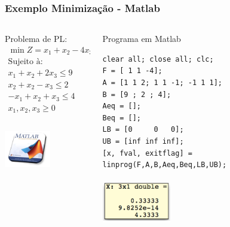 \begin{frame}[fragile]
	\frametitle{Exemplo Minimização - Matlab}
	\centering
	\begin{columns}
		\begin{column}{0.3\textwidth}
			\begin{block}{Problema de PL:}
				\begin{equation*}
					\begin{matrix}
						\scriptstyle \min Z = x_1 + x_2 - 4x_3 \\
						\scriptstyle \text{Sujeito à:} \\
						\scriptstyle x_1 + x_2 + 2x_3 \le 9 \\
						\scriptstyle x_2 + x_2 - x_3 \le 2 \\
						\scriptstyle -x_1 + x_2 + x_3 \le 4 \\
						\scriptstyle x_1, x_2, x_3 \ge 0 \\
					\end{matrix}
				\end{equation*}
			\end{block}
			\includegraphics[width=2cm,height=2cm]{solver_matlab.png}			
		\end{column}
		\begin{column}{0.7\textwidth}
			\begin{exampleblock}{Programa em Matlab}
				\begin{lstlisting}[basicstyle=\tiny]  
clear all; close all; clc;
F = [ 1 1 -4];
A = [1 1 2; 1 1 -1; -1 1 1];
B = [9 ; 2 ; 4];
Aeq = [];
Beq = [];
LB = [0     0   0]; 
UB = [inf inf inf];
[x, fval, exitflag] = linprog(F,A,B,Aeq,Beq,LB,UB);
				\end{lstlisting}
			\end{exampleblock}
			\includegraphics[width=3cm,height=2cm]{resp_minimizacao.png}
		\end{column}


	\end{columns}
\end{frame}